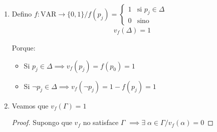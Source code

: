 \begin{itemize}[align=right]
\begin{enumerate}
\begin{proof}
\begin{itemize}
                    \item Si $\Gamma \cup \Delta_j \cup \{ p_j \}$ no es f.s.
                    \begin{align*}
                        \implies& \Delta_{j+1} 
                        = \Delta_j \cup \{ \neg p_j \} \\
                        \implies& \neg p_j \in \Delta_{j+1} \subseteq \Delta
                    \end{align*}            
                \end{itemize}
            \end{proof}

            \item Defino $f:\mathrm{VAR} \to \{ 0,1 \} / f(p_j) = \begin{cases}
                    1 & \text{si } p_j \in \Delta \\
                    0 & \text{sino}
                    \end{cases}$
                \begin{gather*}
                    v_f(\Delta)=1
                \end{gather*}

                Porque:
                \begin{itemize}
                    \item Si  $p_j \in \Delta \implies v_f(p_j) = f(p_0)=1$
                
                    \item Si 
                    $\neg p_j \in \Delta \implies v_f(\neg p_j) = 1 - f(p_j)=1$
                \end{itemize}

            \item Veamos que $v_f(\Gamma)=1$

                \begin{proof} \phantom{.}
                
                    Supongo que $v_f$ no satisface $\Gamma$
                    $\implies \exists \; \alpha \in \Gamma / v_f(\alpha)=0$


\end{proof}
\end{enumerate}
\end{itemize}
